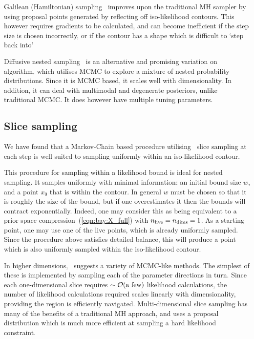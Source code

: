 Galilean (Hamiltonian) sampling~\citep{GalileanNestedSampling,Betancourt2011} improves upon the traditional MH sampler by using proposal points generated by reflecting off iso-likelihood contours. This however requires gradients to be calculated, and can become inefficient if the step size is chosen incorrectly, or if the contour has a shape which is difficult to `step back into'

Diffusive nested sampling~\citep{DiffusiveNestedSampling} is an alternative and promising variation on~ algorithm, which utilises MCMC to explore a mixture of nested probability distributions. Since it is MCMC based, it scales well with dimensionality. In addition, it can deal with multimodal and degenerate posteriors, unlike traditional MCMC\@. It does however have multiple tuning parameters.


\subsection{Slice sampling}
\label{sec:bay:slice_sampling}
We have found that a Markov-Chain based procedure utilising~ slice sampling at each step is well suited to sampling uniformly within an iso-likelihood contour.

This procedure for sampling within a likelihood bound is ideal for nested sampling. It samples uniformly with minimal information: an initial bound size $w$, and a point $x_0$ that is within the contour. In general $w$ must be chosen so that it is roughly the size of the bound, but if one overestimates it then the bounds will contract exponentially. Indeed, one may consider this as being equivalent to a prior space compression~(\ref{eqn:bay:X_full}) with $n_{\mathrm{live}}=n_{\mathrm{dims}}=1$. As a starting point, one may use one of the live points, which is already uniformly sampled. Since the procedure above satisfies detailed balance, this will produce a point which is also uniformly sampled within the iso-likelihood contour.

In higher dimensions,~\cite{NealSlice} suggests a variety of MCMC-like methods. The simplest of these is implemented by sampling each of the parameter directions in turn. Since each one-dimensional slice requires ${\sim\mathcal{O}{\left(\text{a few}\right)}}$ likelihood calculations, the number of likelihood calculations required scales linearly with dimensionality, providing the region is efficiently navigated. Multi-dimensional slice sampling has many of the benefits of a traditional MH approach, and uses a proposal distribution which is much more efficient at sampling a hard likelihood constraint.


